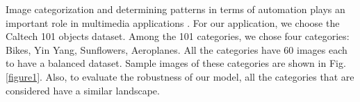 \documentclass[letterpaper]{article}
\begin{document}
Image categorization and determining patterns in terms of automation plays an important role in multimedia applications \cite{maanicshah2019variational}. 
For our application, we choose the Caltech 101 \cite{fei2004learning} objects dataset.
Among the 101 categories, we chose four categories: Bikes, Yin Yang, Sunflowers, Aeroplanes. All the categories have 60 images each to have a balanced dataset. 
Sample images of these categories are shown in Fig. \ref{figure1}. 
Also, to evaluate the robustness of our model, all the categories that are considered have a similar landscape. 
\begin{figure}[h!]
    \hspace*{\fill}




\end{figure}
\end{document}
